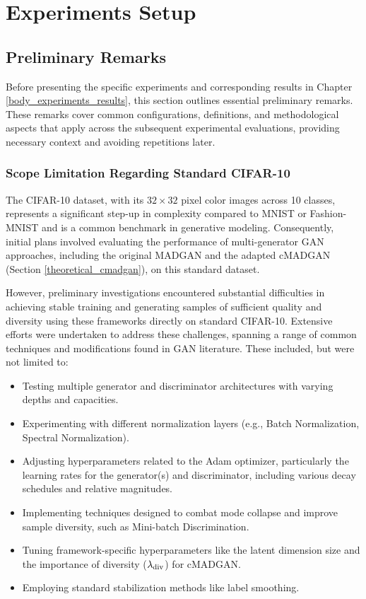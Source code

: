 \section{Experiments Setup}\label{body_experiments_setup}

\subsection{Preliminary Remarks}\label{body_prelim}
Before presenting the specific experiments and corresponding results in Chapter \ref{body_experiments_results}, this section outlines essential preliminary remarks. These remarks cover common configurations, definitions, and methodological aspects that apply across the subsequent experimental evaluations, providing necessary context and avoiding repetitions later.

\subsubsection{Scope Limitation Regarding Standard CIFAR-10}
\label{setup_cifar10_scope}

The CIFAR-10 dataset, with its \(32 \times 32\) pixel color images across 10 classes, represents a significant step-up  in complexity compared to MNIST or Fashion-MNIST and is a common benchmark in generative modeling. Consequently, initial plans involved evaluating the performance of multi-generator GAN approaches, including the original MADGAN \cite{ghosh2018madgan} and the adapted cMADGAN (Section \ref{theoretical_cmadgan}), on this standard dataset.

However, preliminary investigations encountered substantial difficulties in achieving stable training and generating samples of sufficient quality and diversity using these frameworks directly on standard CIFAR-10. Extensive efforts were undertaken to address these challenges, spanning a range of common techniques and modifications found in GAN literature. These included, but were not limited to:

\begin{itemize}
    \item Testing multiple generator and discriminator architectures with varying depths and capacities.
    \item Experimenting with different normalization layers (e.g., Batch Normalization, Spectral Normalization).
    \item Adjusting hyperparameters related to the Adam optimizer, particularly the learning rates for the generator(s) and discriminator, including various decay schedules and relative magnitudes.
    \item Implementing techniques designed to combat mode collapse and improve sample diversity, such as Mini-batch Discrimination.
    \item Tuning framework-specific hyperparameters like the latent dimension size and the importance of diversity (\(\lambda_{\text{div}}\)) for cMADGAN.
    \item Employing standard stabilization methods like label smoothing.
\end{itemize}

